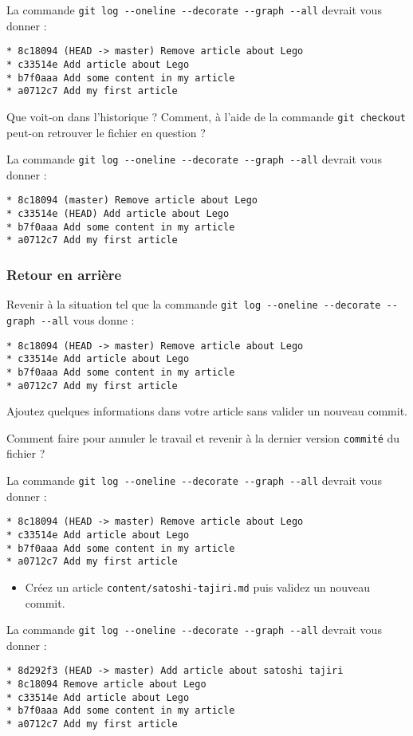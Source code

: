 \documentclass[a4paper]{article}
\begin{document}
La commande \verb|git log --oneline --decorate --graph --all| devrait vous donner :
\begin{verbatim}
* 8c18094 (HEAD -> master) Remove article about Lego
* c33514e Add article about Lego
* b7f0aaa Add some content in my article
* a0712c7 Add my first article
\end{verbatim}

Que voit-on dans l'historique ?
Comment, à l'aide de la commande \verb|git checkout| peut-on retrouver le fichier en question ?

La commande \verb|git log --oneline --decorate --graph --all| devrait vous donner :
\begin{verbatim}
* 8c18094 (master) Remove article about Lego
* c33514e (HEAD) Add article about Lego
* b7f0aaa Add some content in my article
* a0712c7 Add my first article
\end{verbatim}

\subsubsection{Retour en arrière}

Revenir à la situation tel que la commande \verb|git log --oneline --decorate --graph --all| vous donne :
\begin{verbatim}
* 8c18094 (HEAD -> master) Remove article about Lego
* c33514e Add article about Lego
* b7f0aaa Add some content in my article
* a0712c7 Add my first article
\end{verbatim}

Ajoutez quelques informations dans votre article sans valider un nouveau commit.

Comment faire pour annuler le travail et revenir à la dernier version \verb|commité| du fichier ?

La commande \verb|git log --oneline --decorate --graph --all| devrait vous donner :
\begin{verbatim}
* 8c18094 (HEAD -> master) Remove article about Lego
* c33514e Add article about Lego
* b7f0aaa Add some content in my article
* a0712c7 Add my first article
\end{verbatim}

\begin{itemize}
  \item Créez un article \verb|content/satoshi-tajiri.md| puis validez un nouveau commit.
\end{itemize}

La commande \verb|git log --oneline --decorate --graph --all| devrait vous donner :
\begin{verbatim}
* 8d292f3 (HEAD -> master) Add article about satoshi tajiri
* 8c18094 Remove article about Lego
* c33514e Add article about Lego
* b7f0aaa Add some content in my article
* a0712c7 Add my first article
\end{verbatim}
\end{document}
